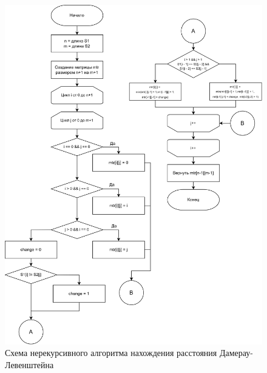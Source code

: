 \documentclass[a4paper,14pt, unknownkeysallowed]{bmstu}
\begin{document}
\clearpage

\begin{figure}[h]
	\centering
	\includegraphics[height=0.8\textheight]{img/dliter.png}
	\caption{Схема нерекурсивного алгоритма нахождения расстояния Дамерау-Левенштейна}
	\label{fig:DLiter}
\end{figure}

\clearpage
\end{document}
